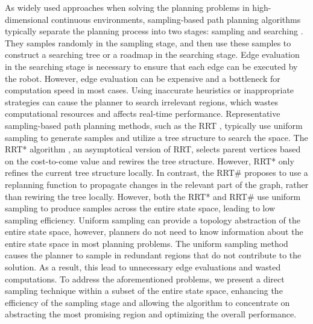 As widely used approaches when solving the planning problems in high-dimensional continuous environments, sampling-based path planning algorithms typically separate the planning process into two stages: sampling and searching \cite{khaksar2016application}.
They samples randomly in the sampling stage, and then use these samples to construct a searching tree or a roadmap in the searching stage. 
Edge evaluation in the searching stage is necessary to ensure that each edge can be executed by the robot.
However, edge evaluation can be expensive and a bottleneck for computation speed in most cases. 
Using inaccurate heuristics or inappropriate strategies can cause the planner to search irrelevant regions, which wastes computational resources and affects real-time performance.
Representative sampling-based path planning methods, such as the RRT \cite{lavalle1998rapidly}, typically use uniform sampling to generate samples and utilize a tree structure to search the space.
The RRT* algorithm \cite{karaman2011sampling}, an asymptotical version of RRT, selects parent vertices based on the cost-to-come value and rewires the tree structure. 
However, RRT* only refines the current tree structure locally.
In contrast, the RRT\# \cite{arslan2013use} proposes to use a replanning function to propagate changes in the relevant part of the graph, rather than rewiring the tree locally.
However, both the RRT* and RRT\# use uniform sampling to produce samples across the entire state space, leading to low sampling efficiency.
Uniform sampling can provide a topology abstraction of the entire state space, however, planners do not need to know information about the entire state space in most planning problems.
The uniform sampling method causes the planner to sample in redundant regions that do not contribute to the solution. 
As a result, this lead to unnecessary edge evaluations and wasted computations.
To address the aforementioned problems, we present a direct sampling technique within a subset of the entire state space, enhancing the efficiency of the sampling stage and allowing the algorithm to concentrate on abstracting the most promising region and optimizing the overall performance.

